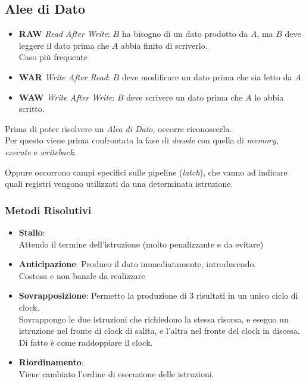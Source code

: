 \documentclass[a4paper,10pt]{article}
\begin{document}
\subsection{Alee di Dato}
\begin{itemize}
    \item \textbf{RAW} \textit{Read After Write}:
        $B$ ha bisogno di un dato prodotto da $A$, ma $B$ deve leggere il dato prima che $A$ abbia finito di scriverlo.
        \\
        Caso più frequente
    \item \textbf{WAR} \textit{Write After Read}:
        $B$ deve modificare un dato prima che sia letto da $A$
    \item \textbf{WAW} \textit{Write After Write}:
        $B$ deve scrivere un dato prima che $A$ lo abbia scritto.
\end{itemize}

Prima di poter risolvere un \textit{Alea di Dato}, occorre riconoscerla.
\\
Per questo viene prima confrontata la fase di \textit{decode} con quella di \textit{memory}, \textit{execute} e \textit{writeback}.

Oppure occorrono campi specifici sulle pipeline (\textit{latch}), che vanno ad indicare quali registri vengono utilizzati da una determinata istruzione.

\subsubsection{Metodi Risolutivi}
\begin{itemize}
    \item \textbf{Stallo}:
        \\
        Attendo il termine dell'istruzione (molto penalizzante e da evitare)
    \item \textbf{Anticipazione}:
        Produco il dato immediatamente, introducendo.
        \\
        Costosa e non banale da realizzare
    \item \textbf{Sovrapposizione}:
        Permetto la produzione di 3 risultati in un unico ciclo di clock.
        \\
        Sovrappongo le due istruzioni che richiedono la stessa risorsa, e eseguo un istruzione nel fronte di clock di salita,
        e l'altra nel fronte del clock in discesa.
        \\
        Di fatto è come raddoppiare il clock.

    \item \textbf{Riordinamento}:
        \\
        Viene cambiato l'ordine di esecuzione delle istruzioni.

\end{itemize}
\end{document}
